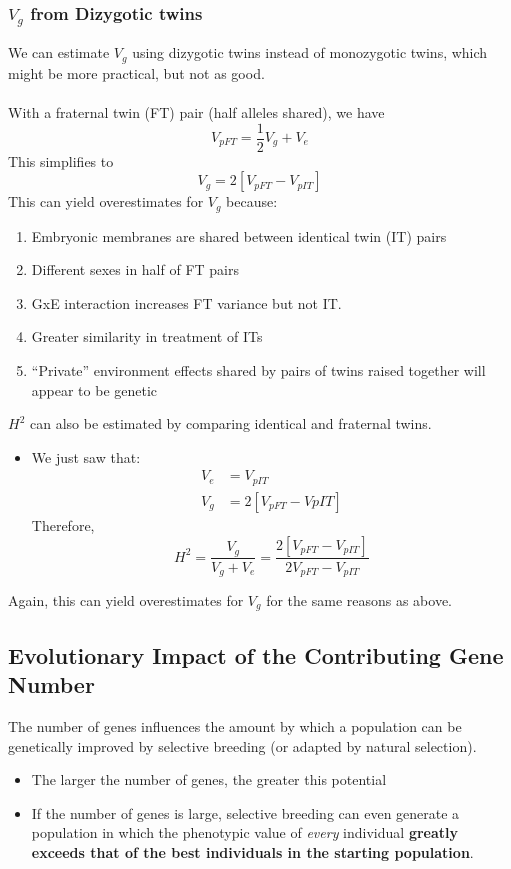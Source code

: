 \documentclass[10pt]{article}
\begin{document}
\subsubsection*{$V_g$ from Dizygotic twins}
We can estimate $V_g$ using dizygotic twins instead of monozygotic twins, which might be more practical, but not as good.\\\\
With a fraternal twin (FT) pair (half alleles shared), we have
\[V_{pFT} = \frac{1}{2} V_g + V_e\]
This simplifies to
\[V_g = 2[V_{pFT} - V_{pIT}]\]
This can yield overestimates for $V_g$ because:
\begin{enumerate}
	\item Embryonic membranes are shared between identical twin (IT) pairs
	\item Different sexes in half of FT pairs
	\item GxE interaction increases FT variance but not IT.
	\item Greater similarity in treatment of ITs
	\item ``Private'' environment effects shared by pairs of twins raised together will appear to be genetic
\end{enumerate}
$H^2$ can also be estimated by comparing identical and fraternal twins.
\begin{itemize}
	\item We just saw that:
	\begin{align*}
    V_e &= V_{pIT} \\
    V_g &= 2[V_{pFT} - V{pIT}]
    \end{align*}
    Therefore,
    \[H^2 = \frac{V_g}{V_g + V_e} = \frac{2[V_{pFT} - V_{pIT}]}{2V_{pFT} - V_{pIT}}\]
\end{itemize}
Again, this can yield overestimates for $V_g$ for the same reasons as above.

\subsection*{Evolutionary Impact of the Contributing Gene Number}
The number of genes influences the amount by which a population can be genetically improved by selective breeding (or adapted by natural selection).
\begin{itemize}
	\item The larger the number of genes, the greater this potential
	\item If the number of genes is large, selective breeding can even generate a population in which the phenotypic value of \textit{every} individual \textbf{greatly exceeds that of the best individuals in the starting population}.
\end{itemize}
\end{document}
